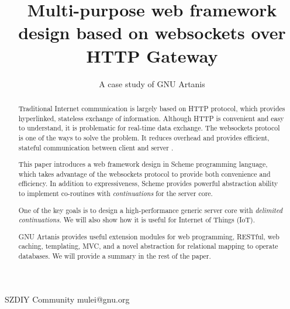 \documentclass[numbers,numberedpars]{sigplanconf}
\begin{document}
\setlength{\pdfpageheight}{\paperheight}
\setlength{\pdfpagewidth}{\paperwidth}




\title{Multi-purpose web framework design based on websockets over HTTP Gateway}
\subtitle{A case study of GNU Artanis}

           {SZDIY Community}
           {mulei@gnu.org}

\maketitle

\begin{abstract}
  Traditional Internet communication is largely based on HTTP protocol, which provides hyperlinked, stateless exchange of information.
  Although HTTP is convenient and easy to understand, it is problematic for real-time data exchange. The websockets protocol is one of the ways to solve the problem. It reduces overhead and provides efficient, stateful communication between client and server \citep{6197172}.
  
  This paper introduces a web framework design in Scheme programming language, which takes advantage of the websockets protocol to provide both convenience and efficiency. In addition to expressiveness, Scheme provides powerful abstraction ability to implement co-routines with {\it continuations} for the server core.

  One of the key goals is to design a high-performance generic server core with {\it delimited continuations}. We will also show how it is useful for Internet of Things (IoT).
  
  GNU Artanis provides useful extension modules for web programming, RESTful, web caching, templating, MVC, and a novel abstraction for relational mapping to operate databases. We will provide a summary in the rest of the paper.
\end{abstract}
\end{document}
